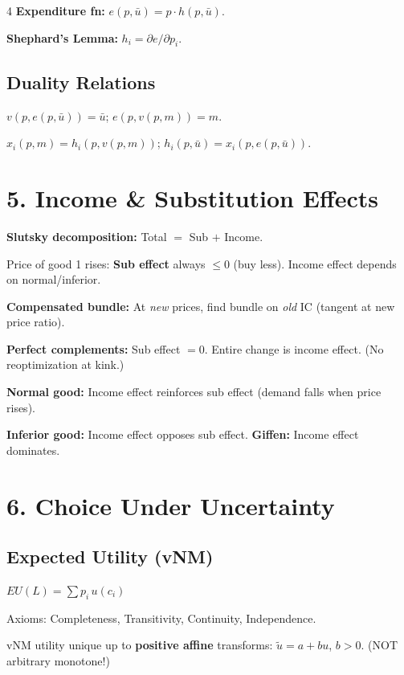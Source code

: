 \documentclass[8pt,landscape]{extarticle}
\newcommand{\HI}[1]{\colorbox{yellow!30}{#1}}
\begin{document}
\begin{multicols}{4}
\textbf{Expenditure fn:} $e(p,\bar{u}) = p\cdot h(p,\bar{u})$.

\textbf{Shephard's Lemma:} $h_i = \partial e/\partial p_i$.

\subsection{Duality Relations}
$v(p, e(p,\bar{u})) = \bar{u}$; \quad $e(p, v(p,m)) = m$.

$x_i(p,m) = h_i(p, v(p,m))$; \quad $h_i(p,\bar{u}) = x_i(p, e(p,\bar{u}))$.

\section{5. Income \& Substitution Effects}

\HI{\textbf{Slutsky decomposition:}} Total $=$ Sub $+$ Income.

Price of good 1 rises: \textbf{Sub effect} always $\leq 0$ (buy less). Income effect depends on normal/inferior.

\textbf{Compensated bundle:} At \emph{new} prices, find bundle on \emph{old} IC (tangent at new price ratio).

\HI{\textbf{Perfect complements:} Sub effect $= 0$.} Entire change is income effect. (No reoptimization at kink.)

\textbf{Normal good:} Income effect reinforces sub effect (demand falls when price rises).

\textbf{Inferior good:} Income effect opposes sub effect. \textbf{Giffen:} Income effect dominates.

\section{6. Choice Under Uncertainty}

\subsection{Expected Utility (vNM)}
\HI{$EU(L) = \sum p_i\, u(c_i)$}

Axioms: Completeness, Transitivity, Continuity, Independence.

vNM utility unique up to \textbf{positive affine} transforms: $\tilde{u} = a + bu$, $b>0$. (NOT arbitrary monotone!)


\end{multicols}
\end{document}

